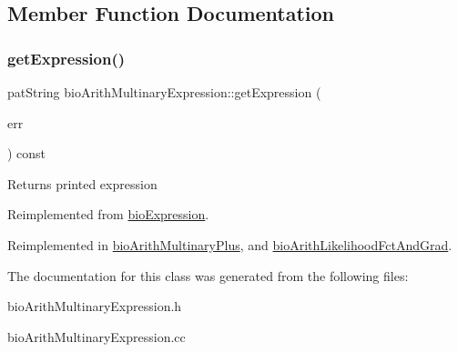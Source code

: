 \subsection{Member Function Documentation}
\mbox{\label{classbio_arith_multinary_expression_a769ab218dc1f1efcdaf3204da0ecc705}} 
\subsubsection{\texorpdfstring{get\+Expression()}{getExpression()}}
{\footnotesize\ttfamily pat\+String bio\+Arith\+Multinary\+Expression\+::get\+Expression (\begin{DoxyParamCaption}\item[{pat\+Error $\ast$\&}]{err }\end{DoxyParamCaption}) const\hspace{0.3cm}{\ttfamily [virtual]}}

\begin{DoxyReturn}{Returns}
printed expression 
\end{DoxyReturn}


Reimplemented from \hyperlink{classbio_expression_a66a83eb0caac18dd5e568ffde5a8b5d4}{bio\+Expression}.



Reimplemented in \hyperlink{classbio_arith_multinary_plus_a11b1c8e85618101f78dee811b2bf2630}{bio\+Arith\+Multinary\+Plus}, and \hyperlink{classbio_arith_likelihood_fct_and_grad_ae264b073115dcff703cf2b7926384976}{bio\+Arith\+Likelihood\+Fct\+And\+Grad}.



The documentation for this class was generated from the following files\+:\begin{DoxyCompactItemize}
\item 
bio\+Arith\+Multinary\+Expression.\+h\item 
bio\+Arith\+Multinary\+Expression.\+cc\end{DoxyCompactItemize}
